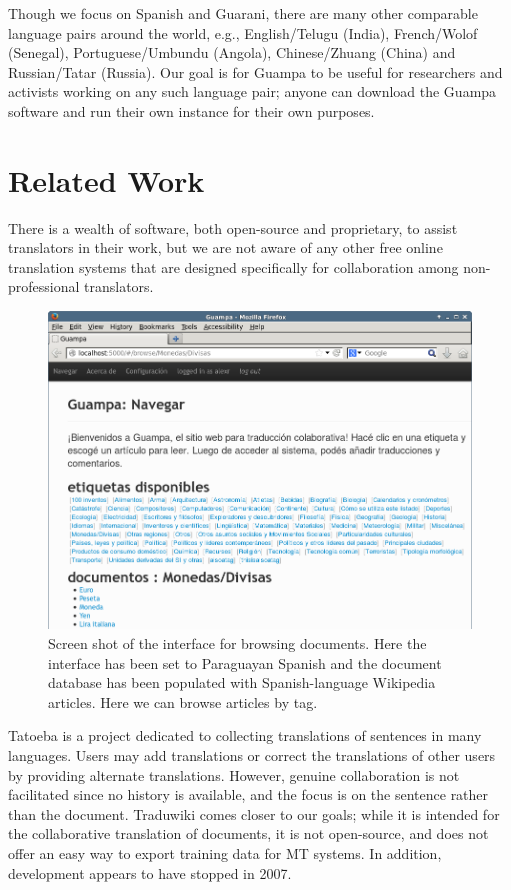 \documentclass[10pt, a4paper]{article}
\begin{document}
Though we focus on Spanish and Guarani, there are many other comparable
language pairs around the world, e.g., English/Telugu (India), French/Wolof
(Senegal), Portuguese/Umbundu (Angola), Chinese/Zhuang (China) and
Russian/Tatar (Russia). Our goal is for Guampa to be useful for researchers and
activists working on any such language pair; anyone can download the Guampa
software and run their own instance for their own purposes.

\section{Related Work}
There is a wealth of software, both open-source and proprietary, to assist
translators in their work, but we are not aware of any other free online
translation systems that are designed specifically for collaboration among
non-professional translators.

\begin{figure}
  \begin{center}
\includegraphics[width=12cm]{guampa-browse-cropped-updated}
  \end{center}
\caption{Screen shot of the interface for browsing documents. Here the
interface has been set to Paraguayan Spanish and the document database has been
populated with Spanish-language Wikipedia articles. Here we can browse articles
by tag.}
\label{fig:browse}
\end{figure}

Tatoeba \cite{tatoeba} is a
project dedicated to collecting translations of sentences in many languages.
Users may add translations or correct the translations of other users by
providing alternate translations. However, genuine collaboration is not
facilitated since no history is available, and the focus is on the sentence
rather than the document. Traduwiki \cite{traduwiki} comes closer
to our goals; while it is intended for the collaborative translation of
documents, it is not open-source, and does not offer an easy way to export
training data for MT systems. In addition, development appears
to have stopped in 2007.
\end{document}
